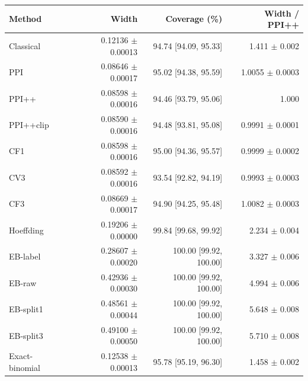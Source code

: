 \small
\begin{tabular}{lrrr}
\toprule
Method & Width & Coverage (\%) & Width / PPI++ \\
\midrule
Classical & 0.12136 $\pm$ 0.00013 & 94.74 [94.09, 95.33] & 1.411 $\pm$ 0.002 \\
PPI & 0.08646 $\pm$ 0.00017 & 95.02 [94.38, 95.59] & 1.0055 $\pm$ 0.0003 \\
PPI++ & 0.08598 $\pm$ 0.00016 & 94.46 [93.79, 95.06] & 1.000 \\
PPI++clip & 0.08590 $\pm$ 0.00016 & 94.48 [93.81, 95.08] & 0.9991 $\pm$ 0.0001 \\
CF1 & 0.08598 $\pm$ 0.00016 & 95.00 [94.36, 95.57] & 0.9999 $\pm$ 0.0002 \\
CV3 & 0.08592 $\pm$ 0.00016 & 93.54 [92.82, 94.19] & 0.9993 $\pm$ 0.0003 \\
CF3 & 0.08669 $\pm$ 0.00017 & 94.90 [94.25, 95.48] & 1.0082 $\pm$ 0.0003 \\
Hoeffding & 0.19206 $\pm$ 0.00000 & 99.84 [99.68, 99.92] & 2.234 $\pm$ 0.004 \\
EB-label & 0.28607 $\pm$ 0.00020 & 100.00 [99.92, 100.00] & 3.327 $\pm$ 0.006 \\
EB-raw & 0.42936 $\pm$ 0.00030 & 100.00 [99.92, 100.00] & 4.994 $\pm$ 0.006 \\
EB-split1 & 0.48561 $\pm$ 0.00044 & 100.00 [99.92, 100.00] & 5.648 $\pm$ 0.008 \\
EB-split3 & 0.49100 $\pm$ 0.00050 & 100.00 [99.92, 100.00] & 5.710 $\pm$ 0.008 \\
Exact-binomial & 0.12538 $\pm$ 0.00013 & 95.78 [95.19, 96.30] & 1.458 $\pm$ 0.002 \\
\bottomrule
\end{tabular}
